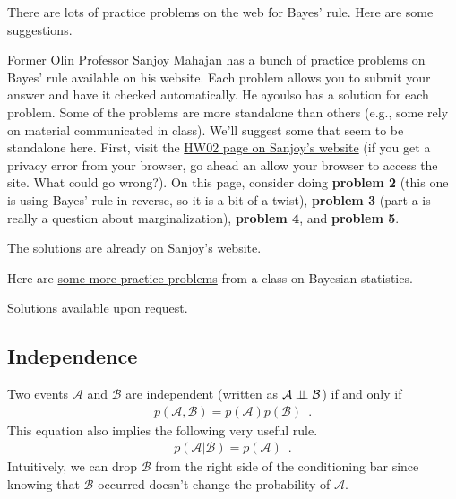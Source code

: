 \documentclass{tufte-handout}
\begin{document}
\begin{exercise}
There are lots of practice problems on the web for Bayes' rule.  Here are some suggestions.
\bes
\item Former Olin Professor Sanjoy Mahajan has a bunch of practice problems on Bayes' rule available on his website.  Each problem allows you to submit your answer and have it checked automatically.  He ayoulso has a solution for each problem.  Some of the problems are more standalone than others (e.g., some rely on material communicated in class).  We'll suggest some that seem to be standalone here.  First, visit the \href{https://tutor.sanjoymahajan.org/bayes/hw02}{HW02 page on Sanjoy's website} (if you get a privacy error from your browser, go ahead an allow your browser to access the site.  What could go wrong?).  On this page, consider doing \textbf{problem 2} (this one is using Bayes' rule in reverse, so it is a bit of a twist), \textbf{problem 3} (part a is really a question about marginalization), \textbf{problem 4}, and \textbf{problem 5}.
\begin{boxedsolution}
The solutions are already on Sanjoy's website.
\end{boxedsolution}
\item Here are \href{http://www2.stat.duke.edu/~jerry/sta101/extraproblems/bayesian.htm}{some more practice problems} from a class on Bayesian statistics.
\begin{boxedsolution}
Solutions available upon request.
\end{boxedsolution}
\ees
\end{exercise}


\subsection{Independence}

Two events $\mathcal{A}$ and $\mathcal{B}$ are independent (written as $\mathcal{A} \perp\!\!\!\perp \mathcal{B}$) if and only if
\begin{align}
p(\mathcal{A}, \mathcal{B}) = p(\mathcal{A}) p(\mathcal{B}) \enspace .
\end{align}
This equation also implies the following very useful rule.
\begin{align}
p(\mathcal{A} | \mathcal{B}) = p(\mathcal{A}) \enspace .
\end{align}
Intuitively, we can drop $\mathcal{B}$ from the right side of the conditioning bar since knowing that $\mathcal{B}$ occurred doesn't change the probability of $\mathcal{A}$.
\end{document}
